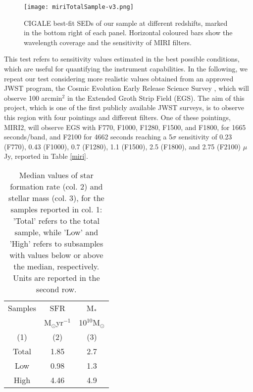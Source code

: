 \documentclass{aa}
\begin{document}
\begin{figure*}\centering
    \texttt{[image: miriTotalSample-v3.png]}
    \caption{CIGALE best-fit SEDs of our sample at different redshifts, marked in the bottom right of each panel. Horizontal coloured bars show the wavelength coverage and the sensitivity of MIRI filters.}\label{miriTotalSample}
\end{figure*}

This test refers to sensitivity values estimated in the best possible conditions, which are useful for quantifying the instrument capabilities. In the following, we repeat our test considering more realistic values obtained from an approved JWST program, the Cosmic Evolution Early Release Science Survey \citep[CEERS,][]{fin}, which will observe 100 arcmin$^2$ in the Extended Groth Strip Field (EGS). The aim of this project, which is one of the first publicly available JWST surveys, is to observe this region with four pointings and different filters. One of these pointings, MIRI2, will observe EGS with F770, F1000, F1280, F1500, and F1800, for 1665 seconds/band, and F2100 for 4662 seconds reaching a 5$\sigma$ sensitivity of 0.23 (F770), 0.43 (F1000), 0.7 (F1280), 1.1 (F1500), 2.5 (F1800), and 2.75 (F2100) $\mu$Jy, reported in Table \ref{miri}.

\begin{table}    \centering
    \begin{tabular}{c|c|c}
    \hline
        Samples &  SFR & M$_\ast$\\
                &  M$_\odot$yr$^{-1}$ & 10$^{10}$M$_\odot$ \\
            (1) &  (2) & (3)\\ 
            \hline
         Total  & 1.85 & 2.7 \\
         Low    & 0.98 & 1.3 \\
         High   & 4.46 & 4.9 \\
         \hline
    \end{tabular}\caption{Median values of star formation rate (col. 2) and stellar mass (col. 3), for the samples reported in col. 1: 'Total' refers to the total sample, while 'Low' and 'High' refers to subsamples with values below or above the median, respectively. Units are reported in the second row.}\label{median}
\end{table}
\end{document}
